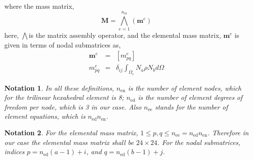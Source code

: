 \documentclass[10pt]{article}
\newcommand{\tmmathbf}[1]{\ensuremath{\boldsymbol{#1}}}
\newcommand{\tmop}[1]{\ensuremath{\operatorname{#1}}}
\newtheorem{notation}{Notation}
\begin{document}

where the mass matrix,
\[ \tmmathbf{M}= \bigwedge_{e = 1}^{n_{\tmop{el}}} (\tmmathbf{m}^e ) \]
here, $\bigwedge$is the matrix assembly operator, and the elemental mass
matrix, $\tmmathbf{m}^e$ is given in terms of nodal submatrices as,
\begin{eqnarray}
  \tmmathbf{m}^e & = & \left[ m_{p q}^e \right] \nonumber\\
  m_{p q}^e & = & \delta_{i j} \int_{\Omega_e} N_a \rho N_b d \Omega 
\end{eqnarray}
\begin{notation}
  In all these definitions, $n_{\tmop{en}}$ is the number of element nodes,
  which for the trilinear hexahedral element is 8; $n_{\tmop{ed}}$ is the
  number of element degrees of freedom per node, which is 3 in our case. Also
  $n_{\tmop{ee}}$ stands for the number of element equations, which is
  $n_{\tmop{ed}} n_{\tmop{en}}$.
\end{notation}

\begin{notation}
  For the elemental mass matrix, $1 \leqslant p, q \leqslant n_{\tmop{ee}} =
  n_{\tmop{ed}} n_{\tmop{en}}$. Therefore in our case the elemental mass
  matrix shall be $24 \times 24$. For the nodal submatrices, indices  $p =
  n_{\tmop{ed}} ( a - 1 ) + i$, and $q = n_{\tmop{ed}} ( b - 1 ) + j$. 
\end{notation}
\end{document}
